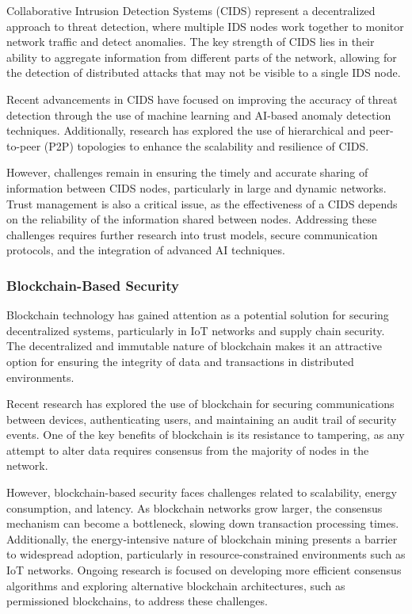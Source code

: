 Collaborative Intrusion Detection Systems (CIDS) represent a decentralized approach to threat detection, where multiple IDS nodes work together to monitor network traffic and detect anomalies. The key strength of CIDS lies in their ability to aggregate information from different parts of the network, allowing for the detection of distributed attacks that may not be visible to a single IDS node.

Recent advancements in CIDS have focused on improving the accuracy of threat detection through the use of machine learning and AI-based anomaly detection techniques. Additionally, research has explored the use of hierarchical and peer-to-peer (P2P) topologies to enhance the scalability and resilience of CIDS.

However, challenges remain in ensuring the timely and accurate sharing of information between CIDS nodes, particularly in large and dynamic networks. Trust management is also a critical issue, as the effectiveness of a CIDS depends on the reliability of the information shared between nodes. Addressing these challenges requires further research into trust models, secure communication protocols, and the integration of advanced AI techniques.

\subsubsection{Blockchain-Based Security}

Blockchain technology has gained attention as a potential solution for securing decentralized systems, particularly in IoT networks and supply chain security. The decentralized and immutable nature of blockchain makes it an attractive option for ensuring the integrity of data and transactions in distributed environments.

Recent research has explored the use of blockchain for securing communications between devices, authenticating users, and maintaining an audit trail of security events. One of the key benefits of blockchain is its resistance to tampering, as any attempt to alter data requires consensus from the majority of nodes in the network.

However, blockchain-based security faces challenges related to scalability, energy consumption, and latency. As blockchain networks grow larger, the consensus mechanism can become a bottleneck, slowing down transaction processing times. Additionally, the energy-intensive nature of blockchain mining presents a barrier to widespread adoption, particularly in resource-constrained environments such as IoT networks. Ongoing research is focused on developing more efficient consensus algorithms and exploring alternative blockchain architectures, such as permissioned blockchains, to address these challenges.

